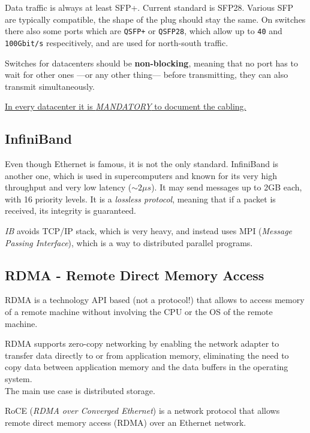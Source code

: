 
Data traffic is always at least SFP+.
Current standard is SFP28. Various SFP are typically compatible, the shape of the plug should stay the same.
On switches there also some ports which are \texttt{QSFP+} or \texttt{QSFP28}, which allow up to \texttt{40} and \texttt{100Gbit/s} respecitively, and are used for north-south traffic.

Switches for datacenters should be \textbf{non-blocking}, meaning that no port has to wait for other ones ---or any other thing--- before transmitting, they can also transmit simultaneously.


\ul{In every datacenter it is \textit{MANDATORY} to document the cabling.}

\subsection{InfiniBand}
Even though Ethernet is famous, it is not the only standard. InfiniBand is another one, which is used in supercomputers and known for its very high throughput and very low latency ($\sim 2\mu s$).
It may send messages up to 2GB each, with 16 priority levels.
It is a \textit{lossless protocol}, meaning that if a packet is received, its integrity is guaranteed.

\textit{IB} avoids TCP/IP stack, which is very heavy, and instead uses MPI (\textit{Message Passing Interface}), which is a way to distributed parallel programs.

\subsection{RDMA - Remote Direct Memory Access}

RDMA is a technology API based (not a protocol!) that allows to access memory of a remote machine without involving the CPU or the OS of the remote machine.

RDMA supports zero-copy networking by enabling the network adapter to transfer data directly to or from application memory, eliminating the need to copy data between application memory and the data buffers in the operating system.\\
The main use case is distributed storage.

RoCE (\textit{RDMA over Converged Ethernet}) is a network protocol that allows remote direct memory access (RDMA) over an Ethernet network.

